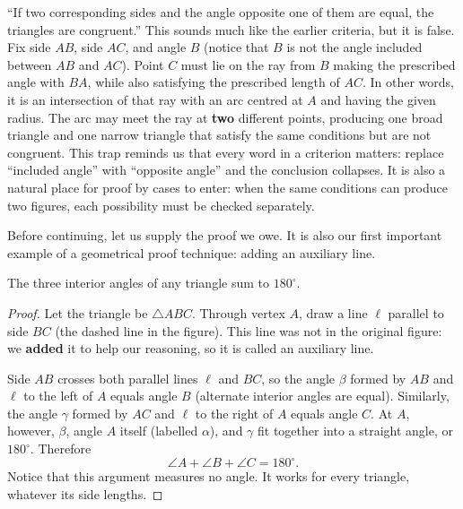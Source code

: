 \begin{fanli}
``If two corresponding sides and the angle opposite one of them are equal, the triangles are congruent.'' This sounds much like the earlier criteria, but it is false. Fix side $AB$, side $AC$, and angle $B$ (notice that $B$ is not the angle included between $AB$ and $AC$). Point $C$ must lie on the ray from $B$ making the prescribed angle with $BA$, while also satisfying the prescribed length of $AC$. In other words, it is an intersection of that ray with an arc centred at $A$ and having the given radius. The arc may meet the ray at \textbf{two} different points, producing one broad triangle and one narrow triangle that satisfy the same conditions but are not congruent. This trap reminds us that every word in a criterion matters: replace ``included angle'' with ``opposite angle'' and the conclusion collapses. It is also a natural place for proof by cases to enter: when the same conditions can produce two figures, each possibility must be checked separately.
\end{fanli}

Before continuing, let us supply the proof we owe. It is also our first important example of a geometrical proof technique: adding an auxiliary line.

\begin{dingli}
The three interior angles of any triangle sum to $180^\circ$.
\end{dingli}

\begin{center}
\end{center}

\begin{proof}
Let the triangle be $\triangle ABC$. Through vertex $A$, draw a line $\ell$ parallel to side $BC$ (the dashed line in the figure). This line was not in the original figure: we \textbf{added} it to help our reasoning, so it is called an auxiliary line.

Side $AB$ crosses both parallel lines $\ell$ and $BC$, so the angle $\beta$ formed by $AB$ and $\ell$ to the left of $A$ equals angle $B$ (alternate interior angles are equal). Similarly, the angle $\gamma$ formed by $AC$ and $\ell$ to the right of $A$ equals angle $C$. At $A$, however, $\beta$, angle $A$ itself (labelled $\alpha$), and $\gamma$ fit together into a straight angle, or $180^\circ$. Therefore
\[
\angle A+\angle B+\angle C=180^\circ.
\]
Notice that this argument measures no angle. It works for every triangle, whatever its side lengths.
\end{proof}

